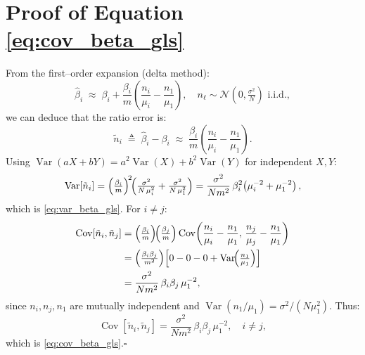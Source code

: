 \documentclass[journal]{IEEEtran}
\begin{document}
\section{Proof of Equation \eqref{eq:cov_beta_gls}}
\label{app:cov_beta_gls}
From the first–order expansion (delta method):
\begin{equation}
\hat{\beta}_i \;\approx\; \beta_i
+ \frac{\beta_i}{m}\!\left(\frac{n_i}{\mu_i} - \frac{n_1}{\mu_1}\right),
\quad
n_\ell \sim \mathcal{N}\!\left(0,\tfrac{\sigma^2}{N}\right) \text{ i.i.d.},
\end{equation}
we can deduce that the ratio error is:
\begin{equation}
\tilde{n}_i \;\triangleq\; \hat{\beta}_i-\beta_i
\;\approx\; \frac{\beta_i}{m}\!\left(\frac{n_i}{\mu_i} - \frac{n_1}{\mu_1}\right).
\label{eq:tilden_i}
\end{equation}
Using $\operatorname{Var}(aX+bY)=a^2\operatorname{Var}(X)+b^2\operatorname{Var}(Y)$ for independent $X,Y$:
\begin{equation}
\operatorname{Var}[\tilde n_i]
=\Bigl(\tfrac{\beta_i}{m}\Bigr)^{\!2}\!
\Bigl(\tfrac{\sigma^2}{N\,\mu_i^{2}}+\tfrac{\sigma^2}{N\,\mu_1^{2}}\Bigr)
=\frac{\sigma^{2}}{N m^{2}}\,
\beta_i^{2}\!\left(\mu_i^{-2}+\mu_1^{-2}\right),
\label{eq:var_beta_gls_proof}
\end{equation}
which is \eqref{eq:var_beta_gls}. For $i\neq j$:
\begin{align}
\operatorname{Cov}[\tilde n_i,\tilde n_j]
&=\Bigl(\tfrac{\beta_i}{m}\Bigr)\!\Bigl(\tfrac{\beta_j}{m}\Bigr)
\operatorname{Cov}\!\left(\frac{n_i}{\mu_i}-\frac{n_1}{\mu_1},\,
                           \frac{n_j}{\mu_j}-\frac{n_1}{\mu_1}\right)\notag\\
&=\Bigl(\tfrac{\beta_i\beta_j}{m^2}\Bigr)\!
\left[0-0-0+\operatorname{Var}\!\Bigl(\tfrac{n_1}{\mu_1}\Bigr)\right]\notag\\
&=\frac{\sigma^{2}}{N m^{2}}\,
\beta_i\beta_j\,\mu_1^{-2},
\label{eq:cov_beta_gls_proof}
\end{align}
since $n_i,n_j,n_1$ are mutually independent and
$\operatorname{Var}(n_1/\mu_1)=\sigma^2/(N\mu_1^2)$.
Thus:
\begin{equation}
\operatorname{Cov}[\tilde{n}_i,\tilde{n}_j]
=
\frac{\sigma^{2}}{N m^{2}}\,
\beta_i\beta_j\,\mu_1^{-2}, \quad i\neq j,
\end{equation}
which is \eqref{eq:cov_beta_gls}.\hfill\(\square\)



\end{document}
